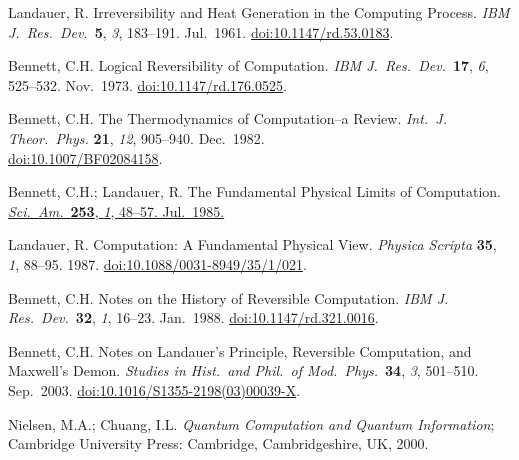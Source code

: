 \documentclass[preprints,article,accept,moreauthors,pdftex]{Definitions/mdpi}
\begin{document}
\begin{thebibliography}{999}

Landauer, R\@. Irreversibility and Heat Generation in the Computing Process. {\em IBM J.\ Res.\ Dev.}\ {\bf 5}, {\em 3}, 183--191. Jul.\ 1961. \href{https://doi.org/10.1147/rd.53.0183}{doi:10.1147/rd.53.0183}.

Bennett, C.H\@. Logical Reversibility of Computation. {\em IBM J.\ Res.\ Dev.}\ {\bf 17}, {\em 6}, 525--532. Nov.\ 1973. \href{https://doi.org/10.1147/rd.176.0525}{doi:10.1147/rd.176.0525}.

Bennett, C.H\@. The Thermodynamics of Computation--a Review. {\em Int.\ J. Theor.\ Phys.} {\bf 21}, {\em 12}, 905--940. Dec.\ 1982.
\\[0pt]
\href{https://doi.org/10.1007/BF02084158}{doi:10.1007/BF02084158}.

Bennett, C.H.; Landauer, R\@. The Fundamental Physical Limits of Computation. \href{https://www.scientificamerican.com/article/the-fundamental-physical-limits-of-computation/}{{\em Sci.\ Am.}\ {\bf 253}, {\em 1}, 48--57. Jul.\ 1985.}

Landauer, R\@. Computation: A Fundamental Physical View. {\em Physica Scripta} {\bf 35}, {\em 1}, 88--95. 1987. \href{https://doi.org/10.1088/0031-8949/35/1/021}{doi:10.1088/0031-8949/35/1/021}.

Bennett, C.H\@. Notes on the History of Reversible Computation. {\em IBM J. Res.\ Dev.}\ {\bf 32}, {\em 1}, 16--23. Jan.\ 1988. \href{https://doi.org/10.1147/rd.321.0016}{doi:10.1147/rd.321.0016}.

Bennett, C.H\@. Notes on Landauer's Principle, Reversible Computation, and Maxwell's Demon. {\em Studies in Hist.\ and Phil.\ of Mod.\ Phys.}\ {\bf 34}, {\em 3}, 501--510. Sep.\ 2003. \href{https://doi.org/10.1016/S1355-2198(03)00039-X}{doi:10.1016/S1355-2198(03)00039-X}. 

Nielsen, M.A.; Chuang, I.L\@. \emph{Quantum Computation and Quantum Information}; Cambridge University Press: Cambridge, Cambridgeshire, UK, 2000.


\end{thebibliography}
\end{document}
